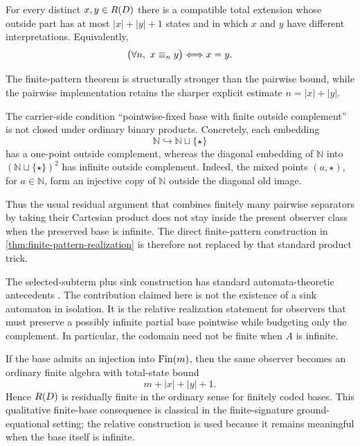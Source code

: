 \begin{corollary}
\label{thm:finite-external-separation}
For every distinct $x,y\in R(D)$ there is a compatible total extension
whose outside part has at most $|x|+|y|+1$ states and in which $x$ and $y$ have
different interpretations.  Equivalently,
\[
 \bigl(\forall n,\ x\stageeq{n}y\bigr)\Longleftrightarrow x=y.
\]
\end{corollary}

The finite-pattern theorem is structurally stronger than the pairwise bound,
while the pairwise implementation retains the sharper explicit estimate
$n=|x|+|y|$.

\begin{proposition}
\label{prop:relative-product-obstruction}
The carrier-side condition ``pointwise-fixed base with finite outside
complement'' is not closed under ordinary binary products.  Concretely, each
embedding
\[
 \mathbb N\hookrightarrow \mathbb N\sqcup\{\star\}
\]
has a one-point outside complement, whereas the diagonal embedding of
$\mathbb N$ into
$(\mathbb N\sqcup\{\star\})^2$ has infinite outside complement.  Indeed, the
mixed points $(a,\star)$, for $a\in\mathbb N$, form an injective copy of
$\mathbb N$ outside the diagonal old image.
\end{proposition}

Thus the usual residual argument that combines finitely many pairwise
separators by taking their Cartesian product does not stay inside the
present observer class when the preserved base is infinite. The direct
finite-pattern construction in \cref{thm:finite-pattern-realization} is
therefore not replaced by that standard product trick.

\begin{remark}
The selected-subterm plus sink construction has standard automata-theoretic
antecedents \cite{ComonEtAl2008}.  The contribution claimed here is not the
existence of a sink automaton in isolation.  It is the relative realization
statement for observers that must preserve a possibly infinite partial base
pointwise while budgeting only the complement.  In particular, the codomain
need not be finite when $A$ is infinite.
\end{remark}

If the base admits an injection into $\operatorname{Fin}(m)$, then the same observer becomes
an ordinary finite algebra with total-state bound
\[
 m+|x|+|y|+1.
\]
Hence $R(D)$ is residually finite in the ordinary sense for finitely coded
bases.  This qualitative finite-base consequence is classical in the
finite-signature ground-equational setting; the relative construction is used
because it remains meaningful when the base itself is infinite.

